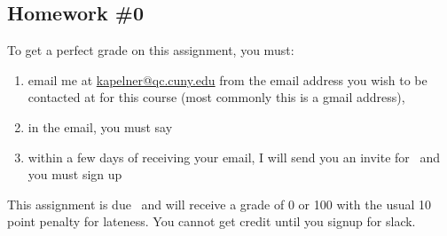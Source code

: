 \subsection*{Homework \#0}\label{subsec:homework_zero}

To get a perfect grade on this assignment, you must:

\begin{enumerate}[(1)]
\item email me at \href{kapelner@qc.cuny.edu}{kapelner@qc.cuny.edu} from the email address you wish to be contacted at for this course (most commonly this is a gmail address),
\item in the email, you must say 
\extrahwzero
\item within a few days of receiving your email, I will send you an invite for \slacklink~and you must sign up
\end{enumerate}

This assignment is due \hwzerodue~and will receive a grade of 0 or 100 with the usual 10 point penalty for lateness. You cannot get credit until you signup for slack. 